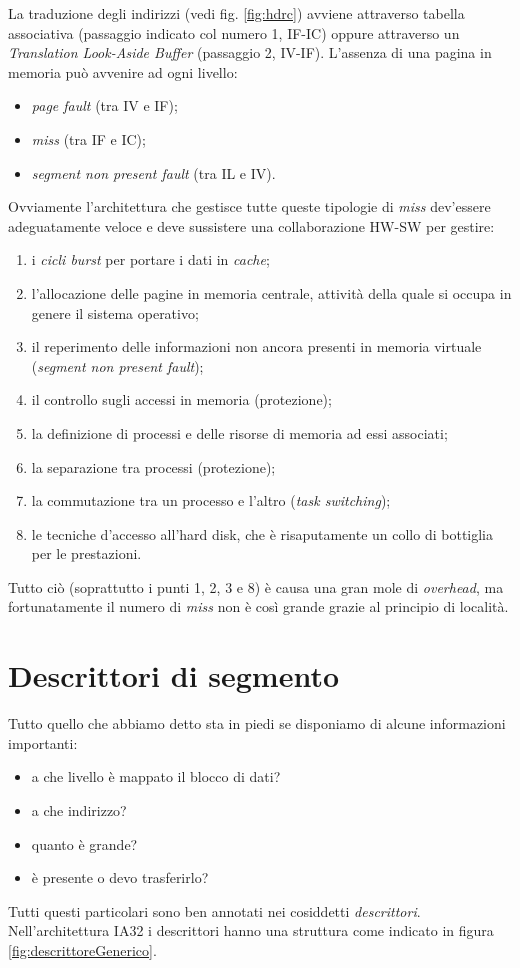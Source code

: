 La traduzione degli indirizzi (vedi fig. \ref{fig:hdrc}) avviene attraverso tabella associativa (passaggio indicato col numero 1, IF-IC) oppure attraverso un \textit{Translation Look-Aside Buffer} (passaggio 2, IV-IF).
L'assenza di una pagina in memoria può avvenire ad ogni livello:
\begin{itemize}
\item \textit{page fault} (tra IV e IF);
\item \textit{miss} (tra IF e IC);
\item \textit{segment non present fault} (tra IL e IV).
\end{itemize}
Ovviamente l'architettura che gestisce tutte queste tipologie di \textit{miss} dev'essere adeguatamente veloce e deve sussistere una collaborazione HW-SW per gestire:
\begin{enumerate}
\item i \textit{cicli burst} per portare i dati in \textit{cache};
\item l'allocazione delle pagine in memoria centrale, attività della quale si occupa in genere il sistema operativo;
\item il reperimento delle informazioni non ancora presenti in memoria virtuale (\textit{segment non present fault});
\item il controllo sugli accessi in memoria (protezione);
\item la definizione di processi e delle risorse di memoria ad essi associati;
\item la separazione tra processi (protezione);
\item la commutazione tra un processo e l'altro (\textit{task switching});
\item le tecniche d'accesso all'hard disk, che è risaputamente un collo di bottiglia per le prestazioni.
\end{enumerate}
Tutto ciò (soprattutto i punti 1, 2, 3 e 8) è causa una gran mole di \textit{overhead}, ma fortunatamente il numero di \textit{miss} non è così grande grazie al principio di località.

\section{Descrittori di segmento}
\label{sec:descrittori}

Tutto quello che abbiamo detto sta in piedi se disponiamo di alcune informazioni importanti:
\begin{itemize}
\item a che livello è mappato il blocco di dati?
\item a che indirizzo?
\item quanto è grande?
\item è presente o devo trasferirlo?
\end{itemize}
Tutti questi particolari sono ben annotati nei cosiddetti \textit{descrittori}. Nell'architettura IA32 i descrittori hanno una struttura come indicato in figura \ref{fig:descrittoreGenerico}.

